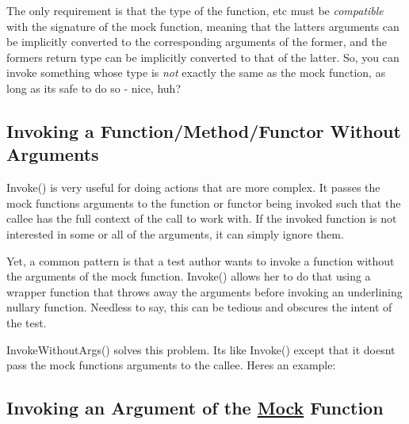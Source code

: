 The only requirement is that the type of the function, etc must be {\itshape compatible} with the signature of the mock function, meaning that the latter\textquotesingle{}s arguments can be implicitly converted to the corresponding arguments of the former, and the former\textquotesingle{}s return type can be implicitly converted to that of the latter. So, you can invoke something whose type is {\itshape not} exactly the same as the mock function, as long as it\textquotesingle{}s safe to do so -\/ nice, huh?

\subsection*{Invoking a Function/\+Method/\+Functor Without Arguments}

{\ttfamily Invoke()} is very useful for doing actions that are more complex. It passes the mock function\textquotesingle{}s arguments to the function or functor being invoked such that the callee has the full context of the call to work with. If the invoked function is not interested in some or all of the arguments, it can simply ignore them.

Yet, a common pattern is that a test author wants to invoke a function without the arguments of the mock function. {\ttfamily Invoke()} allows her to do that using a wrapper function that throws away the arguments before invoking an underlining nullary function. Needless to say, this can be tedious and obscures the intent of the test.

{\ttfamily Invoke\+Without\+Args()} solves this problem. It\textquotesingle{}s like {\ttfamily Invoke()} except that it doesn\textquotesingle{}t pass the mock function\textquotesingle{}s arguments to the callee. Here\textquotesingle{}s an example\+:


\begin{DoxyCode}{0}
\DoxyCodeLine{}
\DoxyCodeLine{\};}
\DoxyCodeLine{}
\DoxyCodeLine{}
\DoxyCodeLine{}
\end{DoxyCode}


\subsection*{Invoking an Argument of the \mbox{\hyperlink{class_mock}{Mock}} Function}

